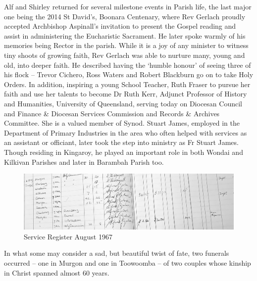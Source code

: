 Alf and Shirley returned for several milestone events in Parish life, the last major one being the 2014 St David's, Boonara Centenary, where Rev Gerlach proudly accepted Archbishop Aspinall's invitation to present the Gospel reading and assist in administering the Eucharistic Sacrament. He later spoke warmly of his memories being Rector in the parish. While it is a joy of any minister to witness tiny shoots of growing faith, Rev Gerlach was able to nurture many, young and old, into deeper faith. He described having the `humble honour' of seeing three of his flock -- Trevor Cichero, Ross Waters and Robert Blackburn go on to take Holy Orders. In addition, inspiring a young School Teacher, Ruth Fraser to pursue her faith and use her talents to become Dr Ruth Kerr, Adjunct Professor of History and Humanities, University of Queensland, serving today on Diocesan Council and Finance \& Diocesan Services Commission and Records \& Archives Committee. She is a valued member of Synod. Stuart James, employed in the Department of Primary Industries in the area who often helped with services as an assistant or officiant, later took the step into ministry as Fr Stuart James. Though residing in Kingaroy, he played an important role in both Wondai and Kilkivan Parishes and later in Barambah Parish too.









\begin{figure}[!htb]
\begin{center}
\includegraphics[width=1.\textwidth,center]{../images/serviceRegisterAug1967.jpg}
\caption{Service Register August 1967}
\end{center}
\end{figure}




In what some may consider a sad, but beautiful twist of fate, two funerals occurred -- one in Murgon and one in Toowoomba -- of two couples whose kinship in Christ spanned almost 60 years.




